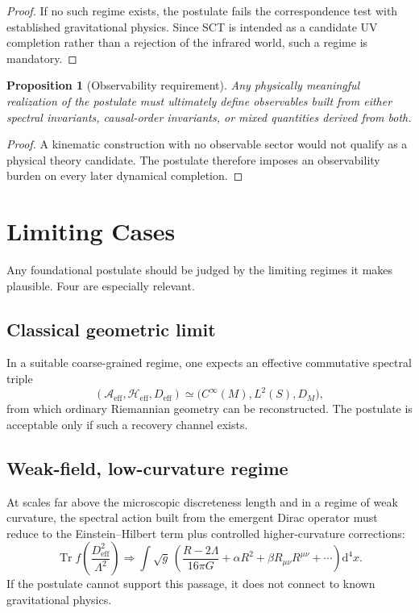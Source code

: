 \documentclass[12pt,a4paper]{article}
\theoremstyle{postulate}
\newtheorem{proposition}{Proposition}[section]
\newcommand{\Tr}{\operatorname{Tr}}
\newcommand{\Hil}{\mathcal{H}}
\newcommand{\Alg}{\mathcal{A}}
\newcommand{\Dirac}{D}
\newcommand{\Cut}{\Lambda}
\newcommand{\dd}{\mathrm{d}}
\begin{document}
\begin{proof}
If no such regime exists, the postulate fails the correspondence test with
established gravitational physics.  Since SCT is intended as a candidate UV
completion rather than a rejection of the infrared world, such a regime is
mandatory.
\end{proof}

\begin{proposition}[Observability requirement]
Any physically meaningful realization of the postulate must ultimately define
observables built from either spectral invariants, causal-order invariants,
or mixed quantities derived from both.
\end{proposition}

\begin{proof}
A kinematic construction with no observable sector would not qualify as a
physical theory candidate.  The postulate therefore imposes an observability
burden on every later dynamical completion.
\end{proof}

\section{Limiting Cases}
\label{sec:limits}

Any foundational postulate should be judged by the limiting regimes it makes
plausible.  Four are especially relevant.

\subsection{Classical geometric limit}

In a suitable coarse-grained regime, one expects an effective commutative
spectral triple
\begin{equation}
  (\Alg_{\mathrm{eff}},\Hil_{\mathrm{eff}},\Dirac_{\mathrm{eff}})
  \simeq
  \bigl(C^\infty(M),L^2(S),\Dirac_M\bigr),
  \label{eq:classical-limit}
\end{equation}
from which ordinary Riemannian geometry can be reconstructed.  The postulate
is acceptable only if such a recovery channel exists.

\subsection{Weak-field, low-curvature regime}

At scales far above the microscopic discreteness length and in a regime of
weak curvature, the spectral action built from the emergent Dirac operator
must reduce to the Einstein--Hilbert term plus controlled higher-curvature
corrections:
\begin{equation}
  \Tr f\!\left(\frac{\Dirac_{\mathrm{eff}}^2}{\Cut^2}\right)
  \Longrightarrow
  \int \sqrt{g}\,
  \left(
    \frac{R-2\Lambda}{16\pi G}
    + \alpha R^2 + \beta R_{\mu\nu}R^{\mu\nu}
    + \cdots
  \right)\dd^4x.
  \label{eq:weak-field-limit}
\end{equation}
If the postulate cannot support this passage, it does not connect to known
gravitational physics.
\end{document}
